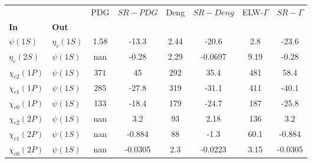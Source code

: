 \begin{tabular}{l|l|c|c|c|c|c|c}
\toprule
                &            &  PDG & $SR-PDG$ &  Deng & $SR-Deng$ &  ELW-$\Gamma$ & $SR-\Gamma$ \\
\textbf{In} & \textbf{Out} &      &          &       &           &               &             \\
\midrule
\textbf{$\psi(1S)$} & \textbf{$\eta_{c}(1S)$} & 1.58 &    -13.3 &  2.44 &     -20.6 &           2.8 &       -23.6 \\
\textbf{$\eta_{c}(2S)$} & \textbf{$\psi(1S)$} &  nan &    -0.28 &  2.29 &   -0.0697 &          9.19 &       -0.28 \\
\textbf{$\chi_{c2}(1P)$} & \textbf{$\psi(1S)$} &  371 &       45 &   292 &      35.4 &           481 &        58.4 \\
\textbf{$\chi_{c1}(1P)$} & \textbf{$\psi(1S)$} &  285 &    -27.8 &   319 &     -31.1 &           411 &       -40.1 \\
\textbf{$\chi_{c0}(1P)$} & \textbf{$\psi(1S)$} &  133 &    -18.4 &   179 &     -24.7 &           187 &       -25.8 \\
\textbf{$\chi_{c2}(2P)$} & \textbf{$\psi(1S)$} &  nan &      3.2 &    93 &      2.18 &           136 &         3.2 \\
\textbf{$\chi_{c1}(2P)$} & \textbf{$\psi(1S)$} &  nan &   -0.884 &    88 &      -1.3 &          60.1 &      -0.884 \\
\textbf{$\chi_{c0}(2P)$} & \textbf{$\psi(1S)$} &  nan &  -0.0305 &   2.3 &   -0.0223 &          3.15 &     -0.0305 \\
\bottomrule
\end{tabular}
